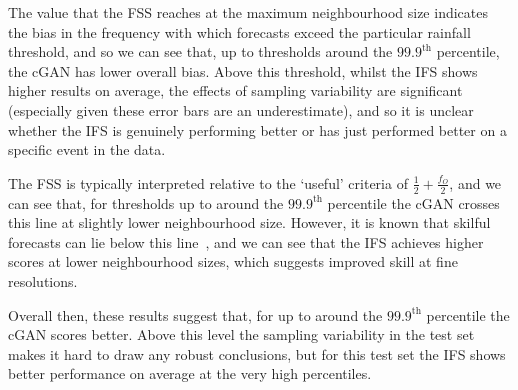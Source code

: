 \documentclass{article}
\begin{document}
The value that the FSS reaches at the maximum neighbourhood size indicates the bias in the frequency with which forecasts exceed the particular rainfall threshold, and so we can see that, up to thresholds around the $99.9^{\text{th}}$ percentile, the cGAN has lower overall bias. Above this threshold, whilst the IFS shows higher results on average, the effects of sampling variability are significant (especially given these error bars are an underestimate), and so it is unclear whether the IFS is genuinely performing better or has just performed better on a specific event in the data. 

The FSS is typically interpreted relative to the `useful' criteria of $\frac{1}{2} + \frac{f_O}{2}$, and we can see that, for thresholds up to around the $99.9^{\text{th}}$ percentile the cGAN crosses this line at slightly lower neighbourhood size. However, it is known that skilful forecasts can lie below this line~\citep{nachamkin_applying_2015, mittermaier_long-term_2013}, and we can see that the IFS achieves higher scores at lower neighbourhood sizes, which suggests improved skill at fine resolutions. 

Overall then, these results suggest that, for up to around the $99.9^{\text{th}}$ percentile the cGAN scores better. Above this level the sampling variability in the test set makes it hard to draw any robust conclusions, but for this test set the IFS shows better performance on average at the very high percentiles.
\end{document}
